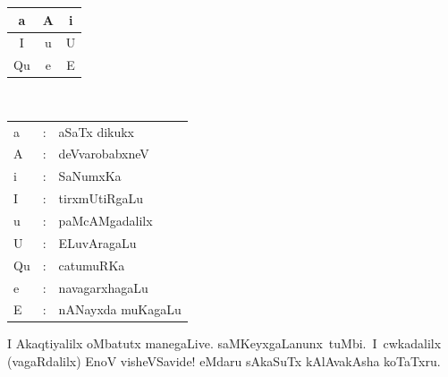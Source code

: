 {
\begin{minipage}[t]{5cm}
\begin{center}
\begin{tabular}[t]{|c|c|c|}
\hline
a & A & i\\
\hline
I & u & U\\
\hline
Qu & e & E\\
\hline
\end{tabular}
\end{center}
\end{minipage}
~~
\begin{minipage}[t]{5cm}
\begin{tabular}[t]{l@{\;\,}c@{\;\,}l}
a &:& aSaTx dikukx\\
A &:& deVvarobabxneV\\
i &:& SaNumxKa\\
I &:& tirxmUtiRgaLu\\
u &:& paMcAMgadalilx\\
U &:& ELuvAragaLu\\
Qu &:& catumuRKa\\
e &:& navagarxhagaLu\\
E &:& nANayxda muKagaLu
\end{tabular}
\end{minipage}}\relax

\vfill\eject

I Akaqtiyalilx oMbatutx manegaLive. \hbox{saMKeyxgaLanunx tuMbi. I cwkadalilx} (vagaRdalilx) EnoV visheVSavide! eMdaru sAkaSuTx kAlAvakAsha koTaTxru.

